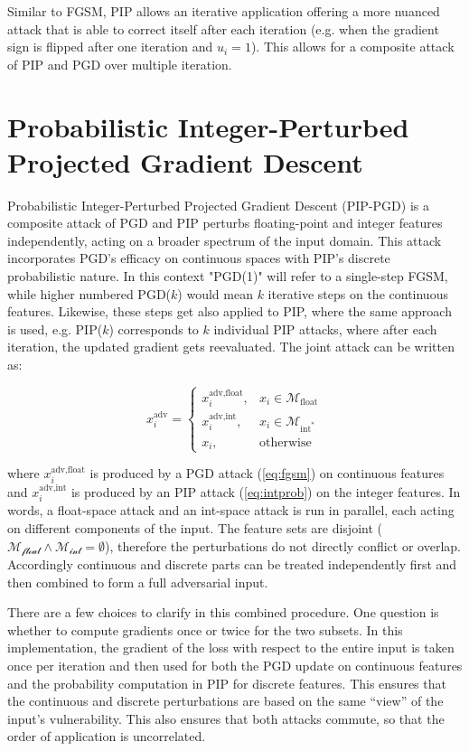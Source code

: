 Similar to FGSM, PIP allows an iterative application offering a more nuanced attack that is able to correct itself after each iteration (e.g. when the gradient sign is flipped after one iteration and $u_i=1$). This allows for a composite attack of PIP and PGD over multiple iteration. 

\section{Probabilistic Integer-Perturbed Projected Gradient Descent}
\label{sec:method_combined}

Probabilistic Integer-Perturbed Projected Gradient Descent (PIP-PGD) is a composite attack of PGD and PIP perturbs floating-point and integer features independently, acting on a broader spectrum of the input domain. This attack incorporates PGD's efficacy on continuous spaces with PIP's discrete probabilistic nature. In this context "PGD(1)" will refer to a single-step FGSM, while higher numbered PGD($k$) would mean $k$ iterative steps on the continuous features. Likewise, these steps get also applied to PIP, where the same approach is used, e.g. PIP($k$) corresponds to $k$ individual PIP attacks, where after each iteration, the updated gradient gets reevaluated. The joint attack can be written as:

\begin{equation}
x_i^{\text{adv}} = 
    \begin{cases} 
    x^{\text{adv,float}}_i, & x_i\in\mathcal{M}_{\text{float}} \\[4pt]
    x^{\text{adv,int}}_i,   & x_i\in\mathcal{M}_{\text{int}^*}   \\[4pt]
    x_i, & \text{otherwise}
    \end{cases}
\label{eq:joint_attack}
\end{equation}

where $x^{\text{adv,float}}_i$ is produced by a PGD attack (\ref{eq:fgsm}) on continuous features and $x^{\text{adv,int}}_i$ is produced by an PIP attack (\ref{eq:intprob}) on the integer features. In words, a float-space attack and an int-space attack is run in parallel, each acting on different components of the input. The feature sets are disjoint ($\mathcal{M_{\text{float}}} \wedge \mathcal{M_{\text{int}}}=\emptyset$), therefore the perturbations do not directly conflict or overlap. Accordingly continuous and discrete parts can be treated independently first and then combined to form a full adversarial input.

There are a few choices to clarify in this combined procedure. One question is whether to compute gradients once or twice for the two subsets. In this implementation, the gradient of the loss with respect to the entire input is taken once per iteration and then used for both the PGD update on continuous features and the probability computation in PIP for discrete features. This ensures that the continuous and discrete perturbations are based on the same “view” of the input’s vulnerability. This also ensures that both attacks commute, so that the order of application is uncorrelated.